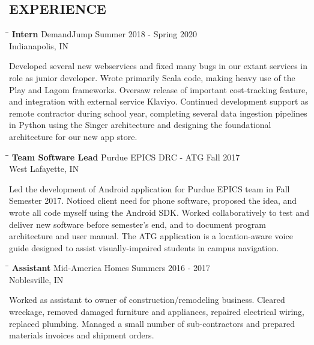 \documentclass[10pt]{res}
\begin{document}
\begin{resume}
\vspace{-20pt}\section{EXPERIENCE}
   \vspace{-0.1in}	
	\begin{tabbing}
   \hspace{2.3in}\= \hspace{2.6in}\= \kill %
    {\bf Intern} \>DemandJump \>Summer 2018 - Spring 2020 \\
                             \>Indianapolis, IN
   \end{tabbing}\vspace{-20pt}      %
  Developed several new webservices and fixed many bugs in our extant services in role as junior
  developer. Wrote primarily Scala code, making heavy use of the Play and Lagom frameworks. Oversaw release of important cost-tracking feature, and integration with external service
  Klaviyo. Continued development support as remote contractor during school year, completing several
	data ingestion pipelines in Python using the Singer architecture and designing the foundational architecture
	for our new app store.
	\vspace{-10pt}\begin{tabbing}
   \hspace{2.3in}\= \hspace{2.6in}\= \kill %
    {\bf Team Software Lead} \>Purdue EPICS DRC - ATG \>Fall 2017 \\
                             \>West Lafayette, IN
   \end{tabbing}\vspace{-20pt}      %
	Led the development of Android application for Purdue EPICS team in Fall Semester 2017. Noticed client need for phone software, proposed the idea, and wrote all code myself
	using the Android SDK. Worked collaboratively to test and deliver new software before semester's end, and to document program architecture and user manual. The ATG
	application is a location-aware voice guide designed to assist visually-impaired students in campus navigation.
	\vspace{-10pt}\begin{tabbing}
   \hspace{2.3in}\= \hspace{2.6in}\= \kill %
    {\bf Assistant} \>Mid-America Homes \>Summers 2016 - 2017 \\
                             \>Noblesville, IN
   \end{tabbing}\vspace{-20pt}      %
	Worked as assistant to owner of construction/remodeling business. 
	Cleared wreckage, removed damaged furniture and appliances, repaired electrical wiring, replaced plumbing. 
	Managed a small number of sub-contractors and prepared materials invoices and shipment orders. 
	

\end{resume}
\end{document}
